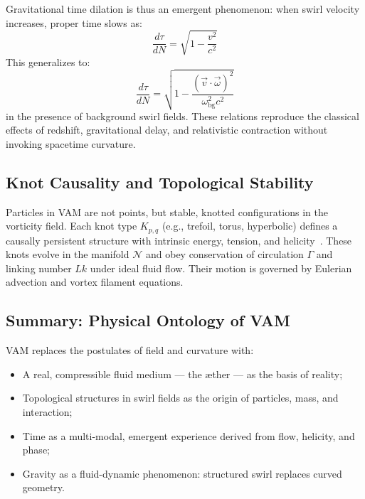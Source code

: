 \documentclass[preprint]{revtex4-2}
\begin{document}
    Gravitational time dilation is thus an emergent phenomenon: when swirl velocity increases, proper time slows as:
    \begin{equation}
        \frac{d\tau}{dN} = \sqrt{1 - \frac{v^2}{c^2}}
        \label{eq:basic_time_deviation}
    \end{equation}
    This generalizes to:
    \begin{equation}
        \frac{d\tau}{dN} = \sqrt{1 - \frac{(\vec{v} \cdot \vec{\omega})^2}{\omega_{\text{bg}}^2 c^2}}
        \label{eq:helicity_time_deviation}
    \end{equation}
    in the presence of background swirl fields. These relations reproduce the classical effects of redshift, gravitational delay, and relativistic contraction without invoking spacetime curvature.

    \subsection{Knot Causality and Topological Stability}
    Particles in VAM are not points, but stable, knotted configurations in the vorticity field. Each knot type $K_{p,q}$ (e.g., trefoil, torus, hyperbolic) defines a causally persistent structure with intrinsic energy, tension, and helicity~\cite{moffatt1969degree, arnold1998topological}. These knots evolve in the manifold $\mathcal{N}$ and obey conservation of circulation $\Gamma$ and linking number $Lk$ under ideal fluid flow. Their motion is governed by Eulerian advection and vortex filament equations.

    \subsection*{Summary: Physical Ontology of VAM}
    VAM replaces the postulates of field and curvature with:
    \begin{itemize}
        \item A real, compressible fluid medium — the æther — as the basis of reality;
        \item Topological structures in swirl fields as the origin of particles, mass, and interaction;
        \item Time as a multi-modal, emergent experience derived from flow, helicity, and phase;
        \item Gravity as a fluid-dynamic phenomenon: structured swirl replaces curved geometry.
    \end{itemize}
\end{document}
